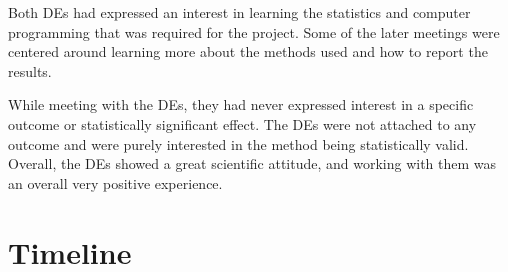 \documentclass{article}
\begin{document}
Both DEs had expressed an interest in learning the statistics and computer programming that was required for the project. Some of the later meetings were centered around learning more about the methods used and how to report the results.

While meeting with the DEs, they had never expressed interest in a specific outcome or statistically significant effect. The DEs were not attached to any outcome and were purely interested in the method being statistically valid. Overall, the DEs showed a great scientific attitude, and working with them was an overall very positive experience.

\section{Timeline}
\end{document}

